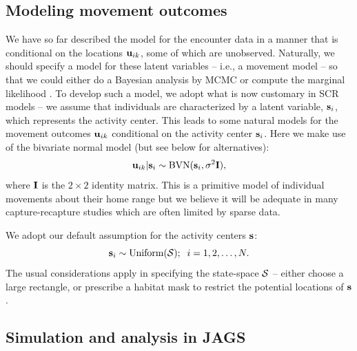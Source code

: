 \subsection{Modeling movement outcomes}

We have so far described the model for the encounter data in a manner
that is conditional on the locations ${\bf u}_{ik}$, some of which are
unobserved. Naturally, we should specify a model for these latent
variables -- i.e., a movement model -- so that we could either do a
Bayesian analysis by MCMC \citep{royle_young:2008, royle_etal:2011mee} or
compute the marginal likelihood \citep{efford:2011}.  To develop such
a model, we adopt what is now customary in SCR models -- we assume
that individuals are characterized by a latent variable, ${\bf
  s}_{i}$, which represents the activity center.  This leads to some
natural models for the movement outcomes ${\bf u}_{ik}$ conditional on
the activity center ${\bf s}_{i}$. Here we make use of the bivariate
normal model (but see below for alternatives):
\[
 {\bf u}_{ik} | {\bf s}_{i} \sim \mbox{BVN}({\bf s}_{i}, \sigma^{2}{\bf I}),
\]
where ${\bf I}$ is the $2\times 2$ identity matrix.
This is a primitive model of individual movements about their home
range but we believe it will be adequate in many capture-recapture
studies which are often limited by sparse data.

We adopt our default assumption for the activity centers ${\bf s}$:
\[
 {\bf s}_{i} \sim \mbox{Uniform}({\cal S}); \; \; i=1,2,\ldots,N.
\]
The usual considerations apply in specifying the state-space ${\cal
  S}$ -- either choose a large rectangle, or prescribe a habitat mask
to restrict the potential locations of ${\bf s}$.



\subsection{Simulation and analysis in {\bf JAGS}}

